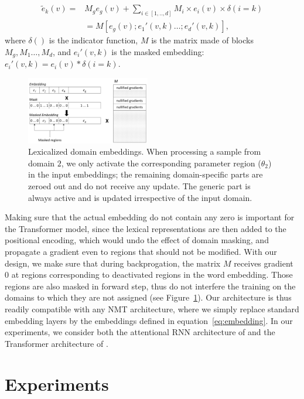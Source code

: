 \begin{align}
  \tilde{e}_k(v) =& M_g e_g(v) + \sum_{i \in [1,..,d]} M_i \times e_i(v) \times \delta(i=k) \nonumber \\
   & = M [e_g(v); e_1'(v,k) \dots; e_d'(v,k)], \label{eq:embedding}
\end{align}
where $\delta()$ is the indicator function, $M$ is the matrix made of blocks $M_g, M_1 \dots, M_d$, and $e_i'(v,k)$ is the masked embedding: $e_i'(v,k)= e_i(v) * \delta(i=k)$.  

\begin{figure}[h]
  \center
  \includegraphics[width=0.48\textwidth]{graphics/embeddings}
  \caption{Lexicalized domain embeddings. When processing a sample from domain $2$, we only activate the corresponding parameter region ($\theta_2$) in the input embeddings; the remaining domain-specific parts are zeroed out and do not receive any update. The generic part is always active and is updated irrespective of the input domain.} 
  \label{fig:network}
\end{figure}

Making sure that the actual embedding do not contain any zero is important for the Transformer model, since the lexical representations are then added to the positional encoding, which would undo the effect of domain masking, and propagate a gradient even to regions that should not be modified. 
With our design, we make sure that during backprogation, the matrix $M$ receives gradient $0$ at regions corresponding to deactivated regions in the word embedding. 
Those regions are also masked in forward step, thus do not interfere the training on the domains to which they are not assigned (see Figure~\ref{fig:network}).
%
Our architecture is thus readily compatible with any NMT architecture, where we simply replace standard embedding layers 
by the embeddings defined
in equation~\eqref{eq:embedding}. In our experiments, we consider both the attentional RNN architecture of \cite{Bahdanau15learning} and the Transformer architecture of \cite{Vaswani17attention}.

\section{Experiments \label{sec:experiments}}

